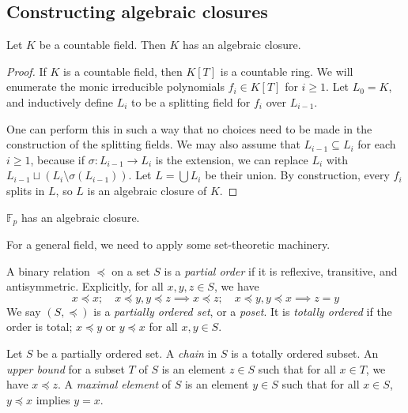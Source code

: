 \subsection{Constructing algebraic closures}
\begin{proposition}
	Let \( K \) be a countable field.
	Then \( K \) has an algebraic closure.
\end{proposition}
\begin{proof}
	If \( K \) is a countable field, then \( K[T] \) is a countable ring.
	We will enumerate the monic irreducible polynomials \( f_i \in K[T] \) for \( i \geq 1 \).
	Let \( L_0 = K \), and inductively define \( L_i \) to be a splitting field for \( f_i \) over \( L_{i-1} \).
	
	One can perform this in such a way that no choices need to be made in the construction of the splitting fields.
	We may also assume that \( L_{i-1} \subseteq L_i \) for each \( i \geq 1 \), because if \( \sigma \colon L_{i-1} \to L_i \) is the extension, we can replace \( L_i \) with \( L_{i-1} \sqcup (L_i \setminus \sigma(L_{i-1})) \).
	Let \( L = \bigcup L_i \) be their union.
	By construction, every \( f_i \) splits in \( L \), so \( L \) is an algebraic closure of \( K \).
\end{proof}
\begin{example}
	\( \mathbb F_p \) has an algebraic closure.
\end{example}
For a general field, we need to apply some set-theoretic machinery.
\begin{definition}
	A binary relation \( \preceq \) on a set \( S \) is a \emph{partial order} if it is reflexive, transitive, and antisymmetric.
	Explicitly, for all \( x, y, z \in S \), we have
	\[ x \preceq x;\quad x \preceq y, y \preceq z \implies x \preceq z;\quad x \preceq y, y \preceq x \implies z = y \]
	We say \( (S, \preceq) \) is a \emph{partially ordered set}, or a \emph{poset}.
	It is \emph{totally ordered} if the order is total; \( x \preceq y \) or \( y \preceq x \) for all \( x, y \in S \).
\end{definition}
\begin{definition}
	Let \( S \) be a partially ordered set.
	A \emph{chain} in \( S \) is a totally ordered subset.
	An \emph{upper bound} for a subset \( T \) of \( S \) is an element \( z \in S \) such that for all \( x \in T \), we have \( x \preceq z \).
	A \emph{maximal element} of \( S \) is an element \( y \in S \) such that for all \( x \in S \), \( y \preceq x \) implies \( y = x \).
\end{definition}
